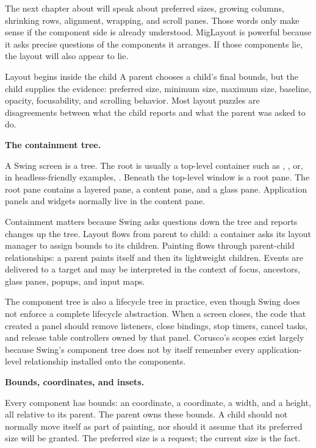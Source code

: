 The next chapter about \miglayout{} will speak about preferred sizes, growing columns, shrinking rows, alignment, wrapping, and scroll panes. Those words only make sense if the component side is already understood. MigLayout is powerful because it asks precise questions of the components it arranges. If those components lie, the layout will also appear to lie.

\begin{principlebox}{Layout begins inside the child}
A parent chooses a child's final bounds, but the child supplies the evidence: preferred size, minimum size, maximum size, baseline, opacity, focusability, and scrolling behavior. Most layout puzzles are disagreements between what the child reports and what the parent was asked to do.
\end{principlebox}

\textbf{The containment tree.}

A Swing screen is a tree. The root is usually a top-level container such as , , or, in headless-friendly examples, . Beneath the top-level window is a root pane. The root pane contains a layered pane, a content pane, and a glass pane. Application panels and widgets normally live in the content pane.

Containment matters because Swing asks questions down the tree and reports changes up the tree. Layout flows from parent to child: a container asks its layout manager to assign bounds to its children. Painting flows through parent-child relationships: a parent paints itself and then its lightweight children. Events are delivered to a target and may be interpreted in the context of focus, ancestors, glass panes, popups, and input maps.

The component tree is also a lifecycle tree in practice, even though Swing does not enforce a complete lifecycle abstraction. When a screen closes, the code that created a panel should remove listeners, close bindings, stop timers, cancel tasks, and release table controllers owned by that panel. Corusco's scopes exist largely because Swing's component tree does not by itself remember every application-level relationship installed onto the components.

\textbf{Bounds, coordinates, and insets.}

Every component has bounds: an  coordinate, a  coordinate, a width, and a height, all relative to its parent. The parent owns these bounds. A child should not normally move itself as part of painting, nor should it assume that its preferred size will be granted. The preferred size is a request; the current size is the fact.

